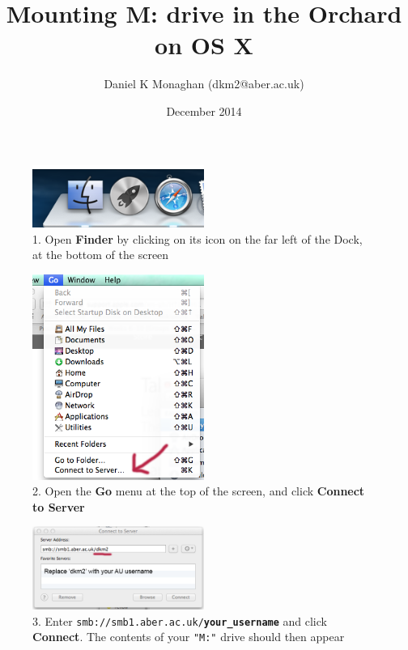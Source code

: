 \documentclass[11pt]{article}
\title{Mounting M: drive in the Orchard on OS X}
\author{Daniel K Monaghan (dkm2@aber.ac.uk)}
\date{December 2014}
\begin{document}
\maketitle


\begin{figure}[H]
    \includegraphics[width=0.5\textwidth]{images/mdrive-1.png}
    \caption*{1. Open \textbf{Finder} by clicking on its icon on the far left of the Dock, at the bottom of the screen}
\end{figure}

\begin{figure}[H]
    \includegraphics[width=0.5\textwidth]{images/mdrive-2.png}
    \caption*{2. Open the \textbf{Go} menu at the top of the screen, and click \textbf{Connect to Server}}
\end{figure}

\begin{figure}[H]
    \includegraphics[width=0.5\textwidth]{images/mdrive-3.png}
    \caption*{3. Enter \texttt{smb://smb1.aber.ac.uk/\textbf{your\_username}} and click \textbf{Connect}. The contents of your \texttt{"M:"} drive should then appear}
\end{figure}
\end{document}

